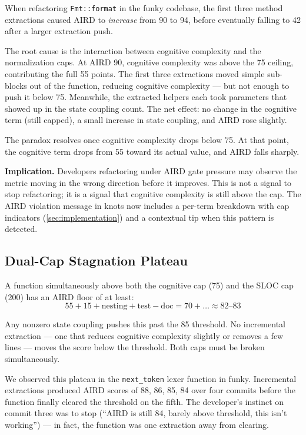 \documentclass[10pt,twocolumn,letterpaper]{article}
\begin{document}
When refactoring \texttt{Fmt::format} in the funky codebase, the first
three method extractions caused AIRD to \emph{increase} from 90 to 94,
before eventually falling to 42 after a larger extraction push.

The root cause is the interaction between cognitive complexity and the
normalization caps.  At AIRD 90, cognitive complexity was above the 75
ceiling, contributing the full 55 points.  The first three extractions
moved simple sub-blocks out of the function, reducing cognitive complexity
--- but not enough to push it below 75.  Meanwhile, the extracted helpers
each took parameters that showed up in the state coupling count.
The net effect: no change in the cognitive term (still capped), a small
increase in state coupling, and AIRD rose slightly.

The paradox resolves once cognitive complexity drops below 75.  At that
point, the cognitive term drops from 55 toward its actual value, and AIRD
falls sharply.

\textbf{Implication.}  Developers refactoring under AIRD gate pressure
may observe the metric moving in the wrong direction before it improves.
This is not a signal to stop refactoring; it is a signal that cognitive
complexity is still above the cap.  The AIRD violation message in knots
now includes a per-term breakdown with cap indicators (\cref{sec:implementation})
and a contextual tip when this pattern is detected.

\subsection{Dual-Cap Stagnation Plateau}
\label{sec:plateau}

A function simultaneously above both the cognitive cap (75) and the SLOC
cap (200) has an AIRD floor of at least:
\begin{equation}
55 + 15 + \text{nesting} + \text{test} - \text{doc} = 70 + \ldots \approx 82\text{--}83
\end{equation}

Any nonzero state coupling pushes this past the 85 threshold.  No
incremental extraction --- one that reduces cognitive complexity slightly
or removes a few lines --- moves the score below the threshold.  Both
caps must be broken simultaneously.

We observed this plateau in the \texttt{next\_token} lexer function in
funky.  Incremental extractions produced AIRD scores of 88, 86, 85, 84
over four commits before the function finally cleared the threshold on
the fifth.  The developer's instinct on commit three was to stop
(``AIRD is still 84, barely above threshold, this isn't working'') ---
in fact, the function was one extraction away from clearing.
\end{document}
